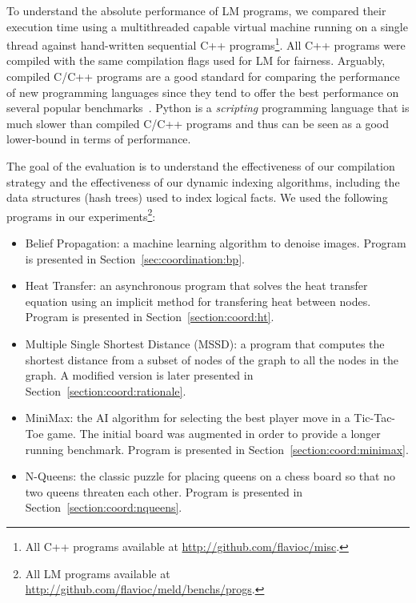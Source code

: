 To understand the absolute performance of LM programs, we compared their
execution time using a multithreaded capable virtual machine running on a single
thread against hand-written sequential C++ programs\footnote{All C++ programs
   available at \url{http://github.com/flavioc/misc}.}. All C++ programs were
   compiled with the same compilation flags used for LM for fairness. Arguably,
   compiled C/C++ programs are a good standard for comparing the performance of
   new programming languages since they tend to offer the best performance on
   several popular benchmarks~\cite{language_benchmarks}.  Python is a
   \emph{scripting} programming language that is much slower than compiled C/C++
   programs and thus can be seen as a good lower-bound in terms of performance.

The goal of the evaluation is to understand the effectiveness of our compilation
strategy and the effectiveness of our dynamic indexing algorithms, including the
data structures (hash trees) used to index logical facts. We used the following
programs in our experiments\footnote{All LM programs available at
   \url{http://github.com/flavioc/meld/benchs/progs}.}:

\begin{itemize}
   \item Belief Propagation: a machine learning algorithm to denoise images. Program is
      presented in Section~\ref{sec:coordination:bp}.

   \item Heat Transfer: an asynchronous program that solves the heat transfer
      equation using an implicit method for transfering heat between nodes.
      Program is presented in Section~\ref{section:coord:ht}.

   \item Multiple Single Shortest Distance (MSSD): a program that computes the
      shortest distance from a subset of nodes of the graph to all the nodes in
      the graph. A modified version is later presented in
      Section~\ref{section:coord:rationale}.

    \item MiniMax: the AI algorithm for selecting the best player move in a
       Tic-Tac-Toe game. The initial board was augmented in order to provide a
       longer running benchmark. Program is presented in
       Section~\ref{section:coord:minimax}.


   \item N-Queens: the classic puzzle for placing queens on a chess board so
      that no two queens threaten each other. Program is presented in
      Section~\ref{section:coord:nqueens}.

\end{itemize}

